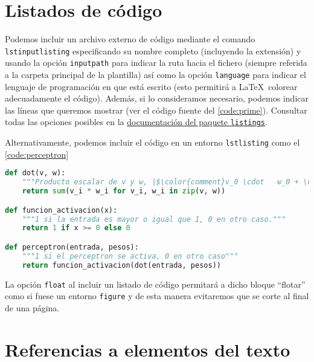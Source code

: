 \section{Listados de código}

Podemos incluir un archivo externo de código mediante el comando \texttt{lstinputlisting} especificando su nombre completo (incluyendo la extensión) y usando la opción \texttt{inputpath} para indicar la ruta hacia el fichero (siempre referida a la carpeta principal de la plantilla) así como la opción \texttt{language} para indicar el lenguaje de programación en que está escrito (esto permitirá a \LaTeX\ colorear adecuadamente el código). Además, si lo consideramos necesario, podemos indicar las líneas que queremos mostrar (ver el código fuente del \autoref{code:prime}). Consultar todas las opciones posibles en la \href{https://osl.ugr.es/CTAN/macros/latex/contrib/listings/listings.pdf}{documentación del paquete \texttt{listings}}.



Alternativamente, podemos incluir el código en un entorno \texttt{lstlisting} como el \autoref{code:perceptron}

\begin{lstlisting}[caption={Implementación de un perceptrón}, label={code:perceptron}, language={python}]
def dot(v, w):
    """Producto escalar de v y w, |$\color{comment}v_0 \cdot   w_0 + \cdots + v_n \cdot w_n$|"""
    return sum(v_i * w_i for v_i, w_i in zip(v, w))

def funcion_activacion(x):
    """1 si la entrada es mayor o igual que 1, 0 en otro caso."""
    return 1 if x >= 0 else 0

def perceptron(entrada, pesos):
    """1 si el perceptron se activa, 0 en otro caso"""
    return funcion_activacion(dot(entrada, pesos))
\end{lstlisting}

La opción \texttt{float} al incluir un listado de código permitará a dicho bloque ``flotar'' como si fuese un entorno \texttt{figure} y de esta manera evitaremos que se corte al final de una página.



\section{Referencias a elementos del texto}\label{sec:referencias}

